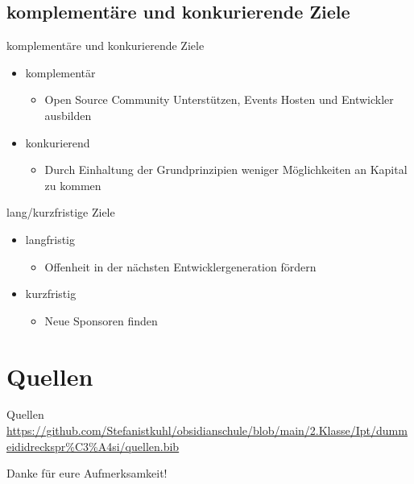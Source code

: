 \documentclass[11pt,aspectratio=169]{beamer}
\begin{document}
\subsection {komplementäre und konkurierende Ziele}
\begin{frame}{komplementäre und konkurierende Ziele}
	\begin{itemize}
		\item komplementär
		      \begin{itemize}
			      \item Open Source Community Unterstützen, Events Hosten und Entwickler ausbilden
		      \end{itemize}
	\end{itemize}
	\begin{itemize}
		\item konkurierend
		      \begin{itemize}
			      \item Durch Einhaltung der Grundprinzipien weniger Möglichkeiten an Kapital zu kommen
		      \end{itemize}
	\end{itemize}
\end{frame}
\begin{frame}{lang/kurzfristige Ziele}
	\begin{itemize}
		\item langfristig
		      \begin{itemize}
			      \item Offenheit in der nächsten Entwicklergeneration fördern
		      \end{itemize}
	\end{itemize}
	\begin{itemize}
		\item kurzfristig
		      \begin{itemize}
			      \item Neue Sponsoren finden
		      \end{itemize}
	\end{itemize}
\end{frame}

\section{Quellen}
\begin{frame}{Quellen}
	\centering
	\url{https://github.com/Stefanistkuhl/obsidianschule/blob/main/2.Klasse/Ipt/dummeididreckspr\%C3\%A4si/quellen.bib}
	
	
\end{frame}
\begin{frame}{Danke für eure Aufmerksamkeit!}
\end{frame}
\end{document}
